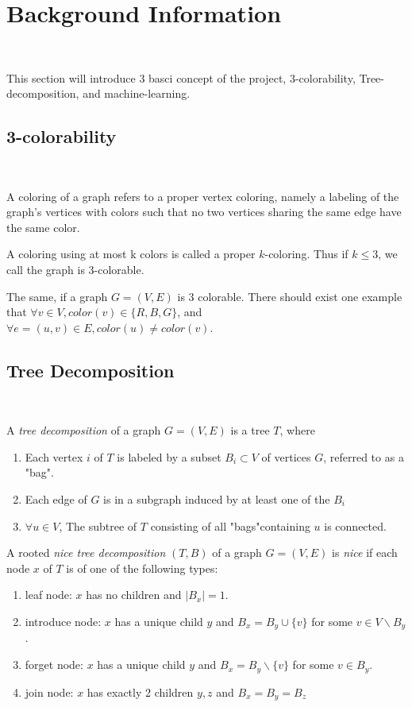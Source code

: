 \section{Background Information}~\label{sec.background}

This section will introduce 3 basci concept of the project, 3-colorability, Tree-decomposition, and machine-learning.

\subsection{3-colorability}~\label{sec.subbackground1}

A coloring of a graph refers to a proper vertex coloring, namely a labeling of the graph's vertices with colors such that no two vertices sharing the same edge have the same color.

A coloring using at most k colors is called a proper $k$-coloring. Thus if $k\le 3$, we call the graph is 3-colorable.

The same, if a graph $G=(V, E)$ is 3 colorable. There should exist one example that $\forall v \in V, color(v) \in \{R, B, G\}$, and $\forall e = (u, v) \in E, color(u) \neq color(v)$.

\subsection{Tree Decomposition}~\label{sec.subbackground2}

A \textit{tree decomposition} of a graph $G=(V, E)$ is a tree $T$, where

\begin{enumerate}
    \item Each vertex $i$ of $T$ is labeled by a subset $B_{i} \subset V$ of vertices $G$, referred to as a "bag".
    \item Each edge of $G$ is in a subgraph induced by at least one of the $B_{i}$
    \item $\forall u \in V$, The subtree of $T$ consisting of all "bags"containing $u$ is connected.
\end{enumerate}

A rooted \textit{nice tree decomposition} $(T, B)$ of a graph $G=(V, E)$ is \textit{nice} if each node $x$ of $T$ is of one of the following types:

\begin{enumerate}
    \item leaf node: $x$ has no children and $|B_{x}| = 1$.
    \item introduce node: $x$ has a unique child $y$ and $B_{x}=B_{y}\cup\{v\}$ for some $v \in V \backslash B_{y}$.
    \item forget node: $x$ has a unique child $y$ and $B_{x}=B_{y}\backslash\{v\}$ for some $v \in B_{y}$.
    \item join node: $x$ has exactly 2 children $y, z$ and $B_{x}=B_{y}=B_{z}$
\end{enumerate}

